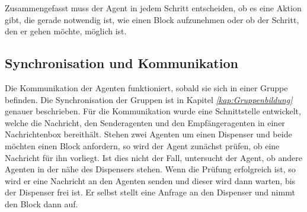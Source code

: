 Zusammengefasst muss der Agent in jedem Schritt entscheiden, ob es eine Aktion gibt, die gerade notwendig ist, wie einen Block aufzunehmen oder ob der Schritt, den er gehen möchte, möglich ist.  

\subsection{Synchronisation und Kommunikation}
Die Kommunikation der Agenten funktioniert, sobald sie sich in einer Gruppe befinden. Die Synchronisation der Gruppen ist in Kapitel \textit{\ref{kap:Gruppenbildung}} genauer beschrieben. Für die Kommunikation wurde eine Schnittstelle entwickelt, welche die Nachricht, den Senderagenten und den Empfängeragenten in einer Nachrichtenbox bereithält. Stehen zwei Agenten um einen Dispenser und beide möchten einen Block anfordern, so wird der Agent zunächst prüfen, ob eine Nachricht für ihn vorliegt. Ist dies nicht der Fall, untersucht der Agent, ob andere Agenten in der nähe des Dispensers stehen. Wenn die Prüfung erfolgreich ist, so wird er eine Nachricht an den Agenten senden und dieser wird dann warten, bis der Dispenser frei ist. Er selbst stellt eine Anfrage an den Dispenser und nimmt den Block dann auf. 
